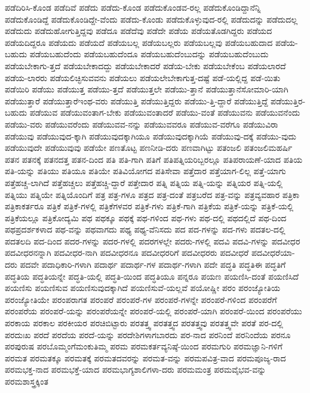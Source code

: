 {ಪಡೆದಿರಿಸಿ-ಕೊಂಡ
ಪಡೆದಿವೆ
ಪಡೆದು
ಪಡೆದು-ಕೊಂಡ
ಪಡೆದುಕೊಂಡವ-ರಲ್ಲ
ಪಡೆದುಕೊಂಡಿದ್ದಾನೆನ್ನಿ
ಪಡೆದುಕೊಂಡಿದ್ದೆ
ಪಡೆದುಕೊಂಡಿದ್ದೇ-ವೆಂದು
ಪಡೆದು-ಕೊಂಡು
ಪಡೆದುಕೊಳ್ಳುವುದ-ರಲ್ಲಿ
ಪಡೆದುದನ್ನು
ಪಡೆದುದಲ್ಲ
ಪಡೆದುದು
ಪಡೆದುಹೋಗುತ್ತಿದ್ದವು
ಪಡೆದೂ
ಪಡೆದೆವು
ಪಡೆದೇ
ಪಡೆಯ
ಪಡೆಯತೊಡಗಿದ್ದರು
ಪಡೆಯದ
ಪಡೆಯದಿದ್ದರೂ
ಪಡೆಯದು
ಪಡೆಯದೆ
ಪಡೆಯಬಲ್ಲ
ಪಡೆಯಬಲ್ಲರು
ಪಡೆಯಬಲ್ಲವು
ಪಡೆಯಬಹುದಾದ
ಪಡೆಯ-ಬಹುದು
ಪಡೆಯಬಹುದೆಂದು
ಪಡೆಯಬಹುದೆಂದೂ
ಪಡೆಯಬಹುದೆಂಬುದನ್ನು
ಪಡೆಯಬಹುದೆಂಬುದು
ಪಡೆಯಬೇಕಾಗು-ತ್ತದೆ
ಪಡೆಯಬೇಕಾದದ್ದು
ಪಡೆಯಬೇಕಾದರೆ
ಪಡೆಯ-ಬೇಕು
ಪಡೆಯಬೇಕೆಂಬ
ಪಡೆಯಲಾರದೆ
ಪಡೆಯ-ಲಾರರು
ಪಡೆಯಲಿಚ್ಛಿಸುವವನು
ಪಡೆಯಲು
ಪಡೆಯಲೇಬೇಕಾಗುತ್ತ-ದಷ್ಟೆ
ಪಡೆ-ಯಲ್ಲಿದ್ದ
ಪಡೆ-ಯಿತು
ಪಡೆಯಿರಿ
ಪಡೆಯು
ಪಡೆಯುತ್ತ
ಪಡೆಯು-ತ್ತದೆ
ಪಡೆಯುತ್ತಲೇ
ಪಡೆಯು-ತ್ತಾನೆ
ಪಡೆಯುತ್ತಾನೆಸೋಮಾರಿ-ಯಾಗಿ
ಪಡೆಯುತ್ತಾರೆ
ಪಡೆಯುತ್ತಾರೆಇಂಥ-ವರು
ಪಡೆಯುತ್ತಿ
ಪಡೆಯುತ್ತಿದ್ದರು
ಪಡೆಯು-ತ್ತಿ-ದ್ದಾರೆ
ಪಡೆಯುತ್ತಿದ್ದೆ
ಪಡೆಯುತ್ತಿರ-ಬಹುದು
ಪಡೆಯುವ
ಪಡೆಯುವಂತಾಗ-ಬೇಕು
ಪಡೆಯುವಂತಾದರೆ
ಪಡೆಯು-ವಂತೆ
ಪಡೆಯುವನು
ಪಡೆಯುವನೆಂದು
ಪಡೆಯು-ವರು
ಪಡೆಯುವರೆಂದು
ಪಡೆಯುವವ-ನನ್ನು
ಪಡೆಯುವವರೂ
ಪಡೆಯುವ-ವರೆಗೂ
ಪಡೆಯುವಿರಾ
ಪಡೆಯುವು
ಪಡೆಯುವುದ-ಕ್ಕಾಗಿ
ಪಡೆಯುವುದಕ್ಕಾಗಿಯೂ
ಪಡೆಯುವುದಕ್ಕಾಗಿಯೆ
ಪಡೆಯುವು-ದಕ್ಕೆ
ಪಡೆಯು-ವುದು
ಪಡೆಯುವುದೇ
ಪಡೆಯುವುವು
ಪಡೆಯೇ
ಪಣತೊಟ್ಟ
ಪಣನೀಡಿ-ದರು
ಪಣವಾಗಿಟ್ಟು
ಪತಂಜಲಿ
ಪತಂಜಲಿಮಹರ್ಷಿ
ಪತನ
ಪತನಕ್ಕೆ
ಪತನದತ್ತ
ಪತನ-ದಿಂದ
ಪತಿ
ಪತಿ-ಗಾಗಿ
ಪತಿಗೆ
ಪತಿಪತ್ನಿಯರಿಬ್ಬರಲ್ಲೂ
ಪತಿಪರಾಯಣೆ-ಯಾದ
ಪತಿಯ
ಪತಿ-ಯನ್ನು
ಪತಿಯು
ಪತಿಯೂ
ಪತಿಯೇ
ಪತಿವಿಯೋಗದ
ಪತಿಸೇವಾ
ಪತ್ತೆದಾರ
ಪತ್ತೆಯಾಗ-ಲಿಲ್ಲ
ಪತ್ತೆ-ಯಾಗು
ಪತ್ತೆಹಚ್ಚ-ಲಾಗಿದೆ
ಪತ್ತೆಹಚ್ಚಲು
ಪತ್ತೆಹಚ್ಚಿ-ದ್ದಾರೆ
ಪತ್ತೇದಾರ
ಪತ್ನಿ
ಪತ್ನಿಯ
ಪತ್ನಿ-ಯನ್ನು
ಪತ್ನಿಯರ
ಪತ್ನಿ-ಯಲ್ಲಿ
ಪತ್ನಿಯು
ಪತ್ನಿಯೇ
ಪತ್ನಿಯೊಂದಿಗೆ
ಪತ್ರ
ಪತ್ರ-ಗಳೂ
ಪತ್ರದ
ಪತ್ರ-ದಂತೆ
ಪತ್ರಬರೆದ
ಪತ್ರ-ವನ್ನು
ಪತ್ರವ್ಯವಹಾರ
ಪತ್ರಿಕಾ
ಪತ್ರಿಕಾಕರ್ತರೂ
ಪತ್ರಿಕೆ
ಪತ್ರಿಕೆ-ಗಳಲ್ಲಿ
ಪತ್ರಿಕೆಗಳವರ
ಪತ್ರಿಕೆ-ಗಳು
ಪತ್ರಿಕೆ-ಗಾಗಿ
ಪತ್ರಿಕೆಯ
ಪತ್ರಿಕೆ-ಯನ್ನು
ಪತ್ರಿಕೆ-ಯಲ್ಲಿ
ಪತ್ರಿಕೆಯಲ್ಲೂ
ಪತ್ರಿಕೋದ್ಯಮಿ
ಪಥ
ಪಥಕ್ಕೂ
ಪಥಕ್ಕೆ
ಪಥ-ಗಳಿಂದ
ಪಥ-ಗಳು
ಪಥ-ದಲ್ಲಿ
ಪಥದಲ್ಲಿದೆ
ಪಥ-ದಿಂದ
ಪಥಪ್ರದರ್ಶಕಳಾದ
ಪಥ-ವನ್ನು
ಪಥವಾಗದು
ಪಥ್ಯ
ಪಥ್ಯ-ವೆನಿಸದು
ಪದ
ಪದ-ಗಳನ್ನು
ಪದ-ಗಳು
ಪದತಲ-ದಲ್ಲಿ
ಪದತಲದಿ
ಪದ-ದಿಂದ
ಪದರ-ಗಳನ್ನು
ಪದರ-ಗಳಲ್ಲಿ
ಪದರಗಳಲ್ಲೇ
ಪದರು-ಗಳಲ್ಲಿ
ಪದವಿ
ಪದವಿ-ಗಳನ್ನು
ಪದವೀಧರ
ಪದವೀಧರನನ್ನಾಗಿ
ಪದವೀಧರ-ನಾಗಿ
ಪದವೀಧರನೂ
ಪದವೀಧರರಿಗೆ
ಪದವೀಧರರು
ಪದವೀಧರೆ
ಪದವೀಧರೆಯಾ-ದರು
ಪದವೇ
ಪದಾಧಿಕಾರಿ-ಗಳಾಗಿ
ಪದಾರ್ಥ
ಪದಾರ್ಥ-ಗಳ
ಪದಾರ್ಥ-ಗಳಾಗಿ
ಪದೇ
ಪದ್ಧತಿ
ಪದ್ಧತಿಈ
ಪದ್ಧತಿಗೆ
ಪದ್ಧತಿಯ
ಪದ್ಧತಿಯನ್ನೇ
ಪದ್ಧತಿ-ಯಲ್ಲಿ
ಪದ್ಧತಿ-ಯಿಂದ
ಪದ್ಧತಿಯೂ
ಪನ್ನರೂ
ಪಯಣ
ಪಯಣಿಸಿ-ದಂತೆ
ಪಯಣಿಸಿದೆ
ಪಯಣಿಸು
ಪಯಣಿಸುವ
ಪಯಣಿಸುವುದಕ್ಕಾಗಿದೆ
ಪಯಣಿಸುವೆ-ಯಲ್ಲವೆ
ಪಯೋಷ್ಣೀ
ಪರಂ
ಪರಂಜ್ಯೋತಿಯ
ಪರಂಜ್ಯೋತಿಯೇ
ಪರಂಪರಾಗತ
ಪರಂಪರೆ
ಪರಂಪರೆ-ಗಳ
ಪರಂಪರೆ-ಗಳನ್ನೇ
ಪರಂಪರೆ-ಗಳಿಂದ
ಪರಂಪರೆಗೆ
ಪರಂಪರೆಯ
ಪರಂಪರೆ-ಯನ್ನು
ಪರಂಪರೆಯನ್ನೇ
ಪರಂಪರೆ-ಯಲ್ಲಿ
ಪರಂಪರೆ-ಯಾಗಿ
ಪರಂಪರೆ-ಯಿಂದ
ಪರಂಪರೆಯು
ಪರಕಾಯ
ಪರಕಾಲ
ಪರಕೀಯರ
ಪರಚಿಬಿಟ್ಟಾರು
ಪರತತ್ತ್ವ
ಪರತತ್ತ್ವದ
ಪರತತ್ತ್ವವು
ಪರತತ್ತ್ವವೇ
ಪರತೆ
ಪರ-ದಲ್ಲಿ
ಪರದುಃಖ
ಪರದೆ
ಪರದೆಯ
ಪರದೆ-ಯನ್ನು
ಪರದೇಶಿಗಳಾಗಬಾರದು
ಪರ-ನಾದ
ಪರನಿಂದೆ
ಪರನಿಂದೆಯ
ಪರನೂ
ಪರಪುರುಷ
ಪರಬೊಮ್ಮಂಗೆಮಂಕುತಿಮ್ಮ
ಪರಮ
ಪರಮಕರ್ತವ್ಯನಿಷ್ಠೆ-ಯಿಂದ
ಪರಮಗುರಿ
ಪರಮಜ್ಞಾನಿ-ಗಳಿಗೆ
ಪರಮತ
ಪರಮತಕ್ಕೂ
ಪರಮತಕ್ಕೆ
ಪರಮತದವರನ್ನು
ಪರಮತ-ವನ್ನು
ಪರಮಪವಿತ್ರ-ವಾದ
ಪರಮಪೂಜ್ಯ-ರಾದ
ಪರಮಭಕ್ತ-ನಾದ
ಪರಮಭಕ್ತೆ-ಯಾದ
ಪರಮಭಾಗ್ಯಶಾಲಿಗಳಾ-ದರು
ಪರಮಮಂತ್ರ
ಪರಮವೈಭವ-ವನ್ನು
ಪರಮಶಾಸ್ತ್ರಕ್ಕಿಂತ
}
